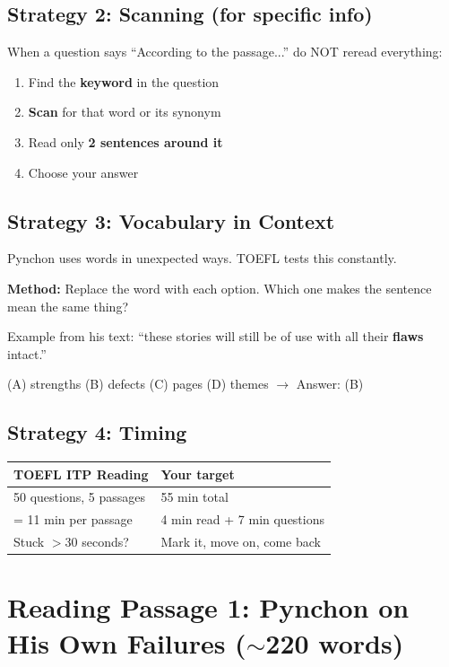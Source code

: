 \documentclass[10pt,a4paper]{article}
\begin{document}
\subsection*{Strategy 2: Scanning (for specific info)}

When a question says ``According to the passage...'' do NOT reread
everything:
\begin{enumerate}[nosep]
\item Find the \textbf{keyword} in the question
\item \textbf{Scan} for that word or its synonym
\item Read only \textbf{2 sentences around it}
\item Choose your answer
\end{enumerate}

\subsection*{Strategy 3: Vocabulary in Context}

Pynchon uses words in unexpected ways. TOEFL tests this constantly.

\textbf{Method:} Replace the word with each option. Which one makes
the sentence mean the same thing?

Example from his text: ``these stories will still be of use with
all their \textbf{flaws} intact.''

(A) strengths (B) defects (C) pages (D) themes $\to$ Answer: (B)

\subsection*{Strategy 4: Timing}

\begin{center}
\begin{tabular}{ll}
\toprule
\textbf{TOEFL ITP Reading} & \textbf{Your target} \\
\midrule
50 questions, 5 passages & 55 min total \\
= 11 min per passage & 4 min read + 7 min questions \\
Stuck $>$30 seconds? & Mark it, move on, come back \\
\bottomrule
\end{tabular}
\end{center}

\section*{Reading Passage 1: Pynchon on His Own Failures ($\sim$220 words)}
\end{document}
